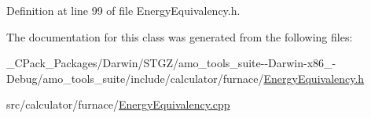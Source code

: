 Definition at line 99 of file Energy\+Equivalency.\+h.



The documentation for this class was generated from the following files\+:\begin{DoxyCompactItemize}
\item 
\+\_\+\+C\+Pack\+\_\+\+Packages/\+Darwin/\+S\+T\+G\+Z/amo\+\_\+tools\+\_\+suite-\/-\/\+Darwin-\/x86\+\_-\/\+Debug/amo\+\_\+tools\+\_\+suite/include/calculator/furnace/\hyperlink{___c_pack___packages_2_darwin_2_s_t_g_z_2amo__tools__suite--_darwin-x86__64-_debug_2amo__tools__46d4d8156642b7bcd4be7fa8e6d162d8}{Energy\+Equivalency.\+h}\item 
src/calculator/furnace/\hyperlink{_energy_equivalency_8cpp}{Energy\+Equivalency.\+cpp}\end{DoxyCompactItemize}

